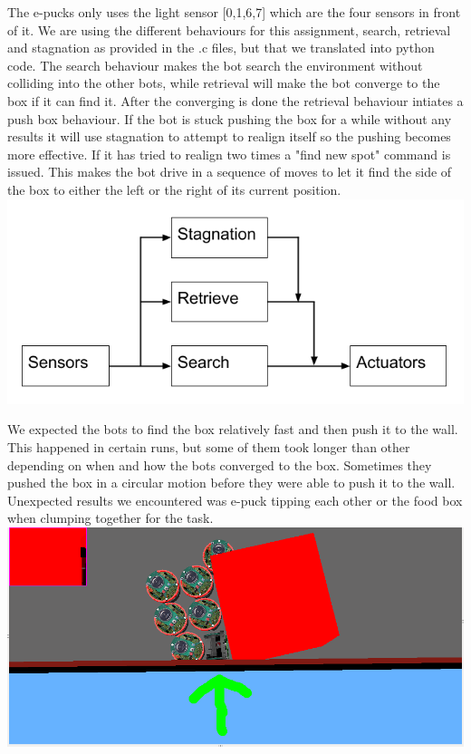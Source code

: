 \documentclass[12pt, a4paper]{article}
\begin{document}
The e-pucks only uses the light sensor [0,1,6,7] which are the four sensors in front of it. We are using the different behaviours for this assignment, search, retrieval and stagnation as provided in the .c files, but that we translated into python code. 
The search behaviour makes the bot search the environment without colliding into the other bots, while retrieval will make the bot converge to the box if it can find it. After the converging is done the retrieval behaviour intiates a push box behaviour. If the bot is stuck pushing the box for a while without any results it will use stagnation to attempt to realign itself so the pushing becomes more effective. If it has tried to realign two times a "find new spot" command is issued. This makes the bot drive in a sequence of moves to let it find the side of the box to either the left or the right of its current position.
\includegraphics[width=\linewidth]{Brooks-lite.png}


We expected the bots to find the box relatively fast and then push it to the wall. This happened in certain runs, but some of them took longer than other depending on when and how the bots converged to the box. Sometimes they pushed the box in a circular motion before they were able to push it to the wall.
Unexpected results we encountered was e-puck tipping each other or the food box when clumping together for the task.\\
\includegraphics[width=\linewidth]{1.mandown.png}
\end{document}
